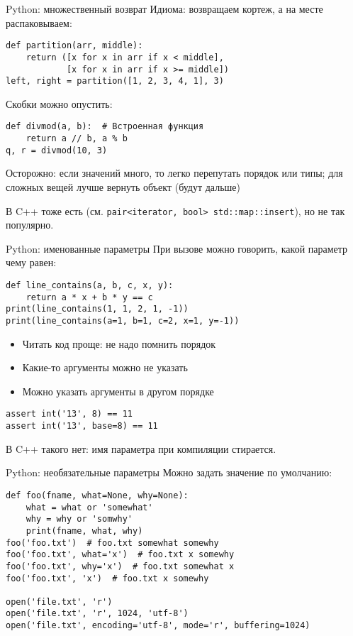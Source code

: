 \begin{frame}[t,fragile]{Python: множественный возврат}
	Идиома: возвращаем кортеж, а на месте распаковываем:
\begin{verbatim}
def partition(arr, middle):
    return ([x for x in arr if x < middle],
            [x for x in arr if x >= middle])
left, right = partition([1, 2, 3, 4, 1], 3)
\end{verbatim}

	Скобки можно опустить:
\begin{verbatim}
def divmod(a, b):  # Встроенная функция
    return a // b, a % b
q, r = divmod(10, 3)
\end{verbatim}

	Осторожно: если значений много, то легко перепутать порядок или типы;
	для сложных вещей лучше вернуть объект (будут дальше)

	В C++ тоже есть (см. \verb`pair<iterator, bool> std::map::insert`),
	но не так популярно.
\end{frame}

\begin{frame}[t,fragile]{Python: именованные параметры}
	При вызове можно говорить, какой параметр чему равен:
\begin{verbatim}
def line_contains(a, b, c, x, y):
	return a * x + b * y == c
print(line_contains(1, 1, 2, 1, -1))
print(line_contains(a=1, b=1, c=2, x=1, y=-1))
\end{verbatim}
	\begin{itemize}
	\item Читать код проще: не надо помнить порядок
	\item Какие-то аргументы можно не указать
	\item Можно указать аргументы в другом порядке
	\end{itemize}

\begin{verbatim}
assert int('13', 8) == 11
assert int('13', base=8) == 11
\end{verbatim}
	В C++ такого нет: имя параметра при компиляции стирается.
\end{frame}

\begin{frame}[t,fragile]{Python: необязательные параметры}
	Можно задать значение по умолчанию:
\begin{verbatim}
def foo(fname, what=None, why=None):
    what = what or 'somewhat'
    why = why or 'somwhy'
    print(fname, what, why)
foo('foo.txt')  # foo.txt somewhat somewhy
foo('foo.txt', what='x')  # foo.txt x somewhy
foo('foo.txt', why='x')  # foo.txt somewhat x
foo('foo.txt', 'x')  # foo.txt x somewhy

open('file.txt', 'r')
open('file.txt', 'r', 1024, 'utf-8')
open('file.txt', encoding='utf-8', mode='r', buffering=1024)
\end{verbatim}
\end{frame}

